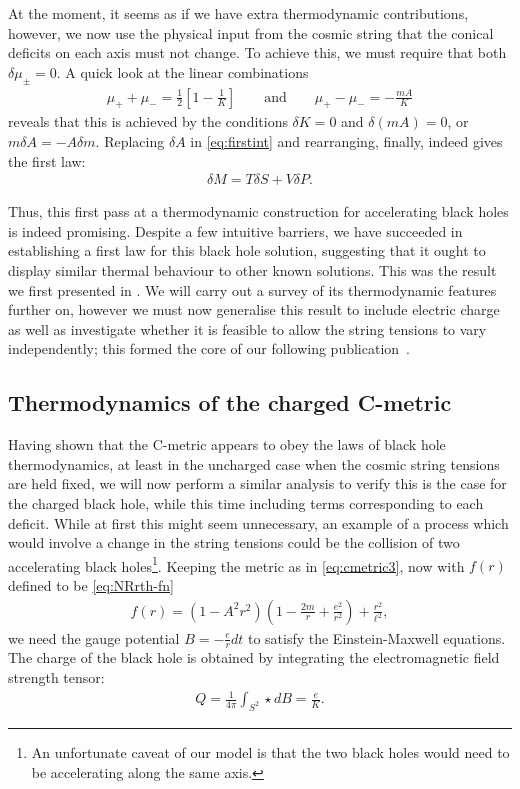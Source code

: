 \documentclass[
twoside,
openright,
frontopenright,
]{dmathesis}
\begin{document}
At the moment, it seems as if we have extra thermodynamic contributions, however,
we now use the physical input from the cosmic string that the conical deficits
on each axis must not change. To achieve this, we must require that both $\delta
\mu_\pm = 0$. A quick look at the linear combinations
\begin{align}
  \mu_+ + \mu_- = \frac12\left[1-\frac{1}{K}\right] \qquad \mbox{and} \qquad \mu_+-\mu_- = -\frac{mA}{K}
\end{align}
reveals that this is achieved by the conditions $\delta K=0$ and
$\delta (mA) = 0$, or $m\delta A = - A \delta m$.  Replacing $\delta A$ in
\cref{eq:firstint} and rearranging, finally, indeed gives the first law:
\begin{align}
\delta M = T \delta S + V \delta P.
\label{eq:firstlawFT}
\end{align}

Thus, this first pass at a thermodynamic construction for accelerating black
holes is indeed promising. Despite a few intuitive barriers, we have succeeded
in establishing a first law for this black hole solution, suggesting that it
ought to display similar thermal behaviour to other known solutions. This was
the result we first presented in \cite{Appels:2016uha}. We will carry out a
survey of its thermodynamic features further on, however we must now generalise
this result to include electric charge as well as investigate whether it is
feasible to allow the string tensions to vary independently; this formed the
core of our following publication~\cite{Appels:2017xoe}.

\subsection{Thermodynamics of the charged C-metric}
\label{sec:cmet-TD-der}

Having shown that the C-metric appears to obey the laws of black hole
thermodynamics, at least in the uncharged case when the cosmic string tensions
are held fixed, we will now perform a similar analysis to verify this is the
case for the charged black hole, while this time including terms corresponding
to each deficit. While at first this might seem unnecessary, an example of a
process which would involve a change in the string tensions could be the
collision of two accelerating black holes\footnote{An unfortunate caveat of our
  model is that the two black holes would need to be accelerating along the same
  axis.}. Keeping the metric as in \cref{eq:cmetric3}, now with $f(r)$ defined
to be \eqref{eq:NRrth-fn}
\begin{align}
  f(r) = (1-A^2r^2)\left(1-\frac{2m}{r} + \frac{e^2}{r^2}\right)+\frac{r^2}{\ell^2},
\end{align}
we need the gauge potential $B = -\frac{e}{r}dt$ to satisfy the Einstein-Maxwell
equations. The charge of the black hole is obtained by integrating the
electromagnetic field strength tensor:
\begin{align}
\label{eq:Qdef}
Q = \frac{1}{4\pi} \int_{S^2} \star dB = \frac{e}{K}.
\end{align}
\end{document}
